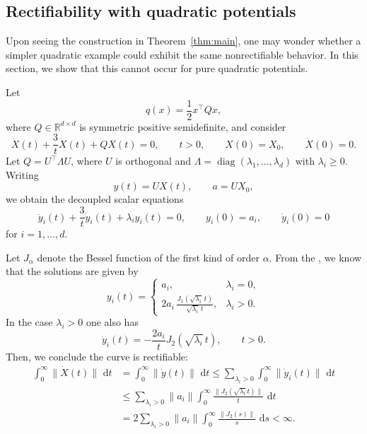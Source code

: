 \documentclass{article}
\theoremstyle{remark}
\newcommand{\R}{\mathbb{R}}
\newcommand{\dd}{\,\mathrm{d}}
\begin{document}
\subsection{Rectifiability with quadratic potentials}\label{sec:quadratic}

Upon seeing the construction in Theorem~\ref{thm:main}, one may wonder whether a simpler quadratic example could exhibit the same nonrectifiable behavior. In this section, we show that this cannot occur for pure quadratic potentials.

Let
\[ 
   q(x)=\frac12 x^\top Qx,
\]
where $Q\in\R^{d\times d}$ is symmetric positive semidefinite, and consider 
\[
  \ddot X(t)+\frac{3}{t}\dot X(t)+QX(t)=0,
  \qquad t>0,
  \qquad X(0)=X_0,
  \qquad \dot X(0)=0.
\]
Let
 $Q=U^\top \Lambda U$, where $U$ is orthogonal and $\Lambda=\operatorname{diag}(\lambda_1,\dots,\lambda_d)$ with $\lambda_i\ge0$. Writing
\[
  y(t)=UX(t),
  \qquad
  a=UX_0,
\]
we obtain the decoupled scalar equations
\[
  \ddot y_i(t)+\frac{3}{t}\dot y_i(t)+\lambda_i y_i(t)=0,
  \qquad y_i(0)=a_i,
  \qquad \dot y_i(0)=0
\]
for $i=1,\dots,d$.

Let $J_\alpha$ denote the Bessel function of the first kind of order $\alpha$.
From the \cite[Section~3.2]{SuBoydCandes2016}, we know that the solutions are given by
\[y_i(t)=
  \begin{cases}
    a_i, & \lambda_i=0,\\[4pt]
    \displaystyle 2a_i\,\frac{J_1(\sqrt{\lambda_i}\,t)}{\sqrt{\lambda_i}\,t}, & \lambda_i>0.
  \end{cases}
\]
In the case $\lambda_i>0$ one also has
\[
    \dot y_i(t)=-\frac{2a_i}{t}J_2(\sqrt{\lambda_i}\,t),
  \qquad t>0.
\]
Then, we conclude the curve is rectifiable:
\begin{align*}
  \int_0^\infty \|\dot X(t)\|\,\dd t
  &=\int_0^\infty \| \dot y(t)\|\,\dd t
  \le \sum_{\lambda_i>0}\int_0^\infty \|\dot y_i(t)\|\,\dd t\\
  &\le\sum_{\lambda_i>0}\| a_i\|\int_0^\infty \frac{\| J_2(\sqrt{\lambda_i}t)\|}{t}\,\dd t\\
  &=2\sum_{\lambda_i>0}\| a_i\|\int_0^\infty \frac{\| J_2(s)\|}{s}\,\dd s<\infty.
\end{align*}



\end{document}
